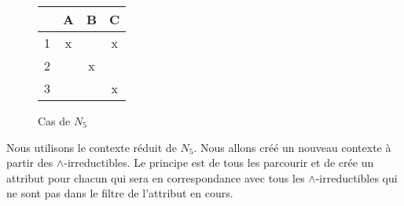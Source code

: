 \begin{figure}[H]
	\begin{minipage}[c]{0.5\textwidth}
	\begin{center}
		\begin{tabular}{ l | c c c }
			 & A & B & C \\
			\hline
			1 & x & & x \\
			2 & & x & \\
			3 & & & x \\
		\end{tabular}
	\end{center}
	\end{minipage}
	\begin{minipage}[c]{0.5\textwidth}
	\begin{center}
	\end{center}
	\end{minipage}
	\caption{Cas de $N_5$}
\end{figure}

Nous utilisons le contexte réduit de $N_5$. Nous allons créé un nouveau contexte à partir des $\wedge$-irreductibles. Le principe est de tous les parcourir et de crée un attribut pour chacun qui sera en correspondance avec tous les $\wedge$-irreductibles qui ne sont pas dans le filtre de l'attribut en cours.

